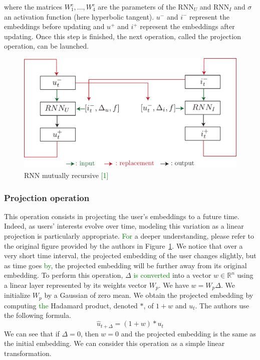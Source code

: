 where the matrices $W_1^e, ..., W_4^e$ are the parameters of the RNN$_U$ and RNN$_I$ and $\sigma$ an activation function (here hyperbolic tangent). $u^-$ and $i^-$ represent the embeddings before updating and $u^+$ and $i^+$ represent the embeddings after updating. Once this step is finished, the next operation, called the projection operation, can be launched.

\begin{figure}[htbp]
   \centering
    \includegraphics[width=1.0\textwidth]{image/rnn_jodie.pdf}
    \caption{RNN mutually recursive \textcolor{green}{[1]}}
    \label{recursive RNNs}
\end{figure}

\subsubsection{Projection operation}

This operation consists in projecting the user's embeddings to a future time. %
Indeed, as users' interests evolve over time, modeling this variation as a linear projection is particularly appropriate. \textcolor{green}{For} %
a deeper understanding, please refer to the original figure provided by the authors in Figure~\ref{recursive RNNs}.
We notice that over a very short time interval, the projected embedding of the user changes slightly, but as time goes \textcolor{green}{by}, the projected embedding will be further away from its original embedding. To perform this operation, %
$\Delta$ \textcolor{green}{is converted} into a vector $w \in \mathbb{R}^n$ using a linear layer represented by its weights vector $W_p$. We have $w = W_p \Delta$.  We initialize $W_p$ by a Gaussian of zero mean. 
We obtain the projected embedding by computing \textcolor{green}{the} Hadamard product, denoted $*$, of $1+w$ and $u_t$. The authors use the following formula.
$$
\widehat u_{t+\Delta} = (1+w) * u_t
$$
We can see that if $\Delta = 0$, then $w=0$ and the projected embedding is the same as the initial embedding. We can consider this operation as a simple linear transformation.

